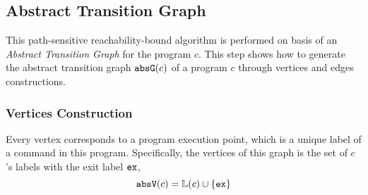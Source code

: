   

\subsection{Abstract Transition Graph}
\label{sec:abscfg}

This path-sensitive reachability-bound algorithm
is performed on basis of an \emph{Abstract Transition Graph} for the program $c$.
This step shows how to generate the abstract transition graph $\mathtt{abs}{\mathtt{G}}(c)$ of a
program $c$ through vertices and edges constructions.

\subsubsection{Vertices Construction}
\label{sec:abscfg-vertex}
Every 
vertex corresponds to a program execution point, which is a unique
label of a command in this program.
Specifically,
the vertices of this graph is the set of $c$'s labels with the exit label ${\mathtt{ex}}$, 
\[ 
  \mathtt{abs}{\mathtt{V}}(c) = \mathbb{L}(c)\cup\{{\mathtt{ex}}\}
  \]

